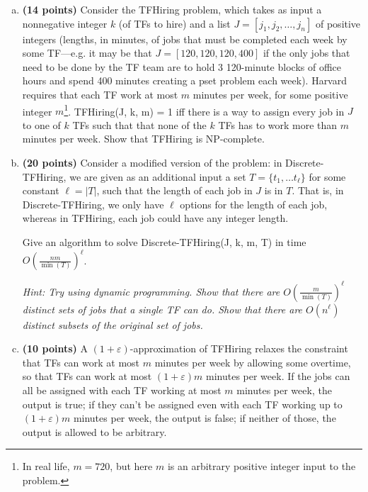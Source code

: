 \documentclass[11pt,letterpaper]{article}
\begin{document}
\pagebreak
\begin{problem}\noindent
    \begin{enumerate}[(a)]
        \item {\bf (14 points)} Consider the \textsf{TFHiring} problem, which takes as input a nonnegative integer $k$ (of TFs to hire) and a list $J = [j_1, j_2, \ldots, j_n]$ of positive integers (lengths, in minutes, of jobs that must be completed each week by some TF---e.g. it may be that $J = [120, 120, 120, 400]$ if the only jobs that need to be done by the TF team are to hold 3 120-minute blocks of office hours and spend 400 minutes creating a pset problem each week). Harvard requires that each TF work at most $m$ minutes per week, for some positive integer $m$\footnote{In real life, $m = 720$, but here $m$ is an arbitrary positive integer input to the problem.}. \textsf{TFHiring(J, k, m)} = 1 iff there is a way to assign every job in $J$ to one of $k$ TFs such that that none of the $k$ TFs has to work more than $m$ minutes per week. Show that \textsf{TFHiring} is NP-complete. 
    
        \item {\bf (20 points)} Consider a modified version of the problem: in \textsf{Discrete-TFHiring}, we are given as an additional input a set $T=\{t_1, \ldots t_{\ell}\}$ for some constant $\ell = |T|$, such that the length of each job in $J$ is in $T$. That is, in \textsf{Discrete-TFHiring}, we only have $\ell$ options for the length of each job, whereas in \textsf{TFHiring}, each job could have any integer length. 

        Give an algorithm to solve \textsf{Discrete-TFHiring(J, k, m, T)} in time $O\left(\frac{nm}{\min(T)}\right)^{\ell}$.
    
        \emph{Hint: Try using dynamic programming. Show that there are $O\left(\frac{m}{\min(T)}\right)^{\ell}$ distinct sets of jobs that a single TF can do. Show that there are $O(n^{\ell})$ distinct subsets of the original set of jobs.}
       
        \item {\bf (10 points)} A $(1+\varepsilon)$-approximation of \textsf{TFHiring} relaxes the constraint that TFs can work at most $m$ minutes per week by allowing some overtime, so that TFs can work at most $(1+\varepsilon)m$ minutes per week. If the jobs can all be assigned with each TF working at most $m$ minutes per week, the output is true; if they can't be assigned even with each TF working up to $(1+\varepsilon)m$ minutes per week, the output is false; if neither of those, the output is allowed to be arbitrary.
    

\end{enumerate}
\end{problem}
\end{document}
